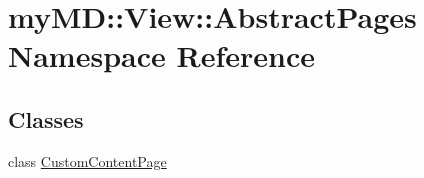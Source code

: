 \hypertarget{namespacemy_m_d_1_1_view_1_1_abstract_pages}{
\section{my\-MD::View::Abstract\-Pages Namespace Reference}
\label{db/d27/namespacemy_m_d_1_1_view_1_1_abstract_pages}
}


\subsection*{Classes}
\begin{CompactItemize}
\item 
class \hyperlink{classmy_m_d_1_1_view_1_1_abstract_pages_1_1_custom_content_page}{Custom\-Content\-Page}
\end{CompactItemize}
